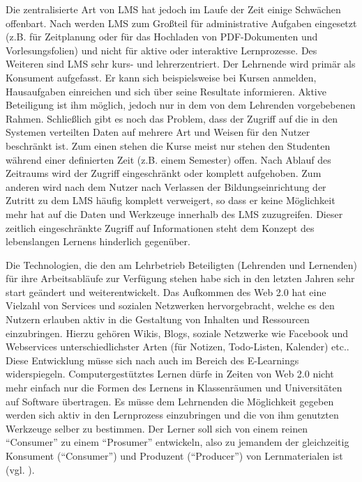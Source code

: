 Die zentralisierte Art von LMS hat jedoch im Laufe der Zeit einige Schwächen offenbart. Nach \cite{Mott2010} werden LMS zum Großteil für administrative Aufgaben eingesetzt (z.B. für Zeitplanung oder für das Hochladen von PDF-Dokumenten und Vorlesungsfolien) und nicht für aktive oder interaktive Lernprozesse. Des Weiteren sind LMS sehr kurs- und lehrerzentriert. Der Lehrnende wird primär als Konsument aufgefasst. Er kann sich beispielsweise bei Kursen anmelden, Hausaufgaben einreichen und sich über seine Resultate informieren. Aktive Beteiligung ist ihm möglich, jedoch nur in dem von dem Lehrenden vorgebebenen Rahmen.
Schließlich gibt es noch das Problem, dass der Zugriff auf die in den Systemen verteilten Daten auf mehrere Art und Weisen für den Nutzer beschränkt ist. Zum einen stehen die Kurse meist nur stehen den Studenten während einer definierten Zeit (z.B. einem Semester) offen. Nach Ablauf des Zeitraums wird der Zugriff eingeschränkt oder komplett aufgehoben. Zum anderen wird nach \cite{Schaffert2008a} dem Nutzer nach Verlassen der Bildungseinrichtung der Zutritt zu dem LMS häufig komplett verweigert, so dass er keine Möglichkeit mehr hat auf die Daten und Werkzeuge innerhalb des LMS zuzugreifen. Dieser zeitlich eingeschränkte Zugriff auf Informationen steht dem Konzept des lebenslangen Lernens hinderlich gegenüber.

Die Technologien, die den am Lehrbetrieb Beteiligten (Lehrenden und Lernenden) für ihre Arbeitsabläufe zur Verfügung stehen habe sich in den letzten Jahren sehr start geändert und weiterentwickelt. Das Aufkommen des Web 2.0 hat eine Vielzahl von Services und sozialen Netzwerken hervorgebracht, welche es den Nutzern erlauben aktiv in die Gestaltung von Inhalten und Ressourcen einzubringen. Hierzu gehören Wikis, Blogs, soziale Netzwerke wie Facebook und Webservices unterschiedlichster Arten (für Notizen, Todo-Listen, Kalender) etc..
Diese Entwicklung müsse sich nach \cite{Attwell2007} auch im Bereich des E-Learnings widerspiegeln. Computergestütztes Lernen dürfe in Zeiten von Web 2.0 nicht mehr einfach nur die Formen des Lernens in Klassenräumen und Universitäten auf Software übertragen. Es müsse dem Lehrnenden die Möglichkeit gegeben werden sich aktiv in den Lernprozess einzubringen und die von ihm genutzten Werkzeuge selber zu bestimmen. Der Lerner soll sich von einem reinen "`Consumer"' zu einem "`Prosumer"' entwickeln, also zu jemandem der gleichzeitig Konsument ("`Consumer"') und Produzent ("`Producer"') von Lernmaterialen ist (vgl. \cite{Schaffert2008a}).


